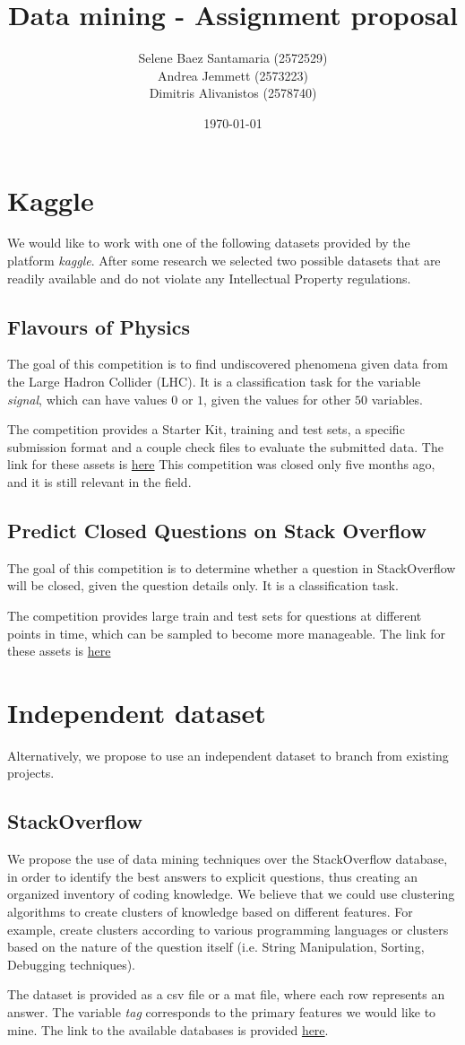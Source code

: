 \documentclass[11pt]{article}
\title{
	{Data mining - Assignment proposal}
}
\author{
Selene Baez Santamaria (2572529) \\
Andrea Jemmett (2573223) \\
Dimitris Alivanistos (2578740)}
\date{\today}
\begin{document}
\maketitle

\section{Kaggle}
We would like to work with one of the following datasets provided by the platform \textit{kaggle}. After some research we selected two possible datasets that are readily available and do not violate any Intellectual Property regulations.  

\subsection{Flavours of Physics}
The goal of this competition is to find undiscovered phenomena given data from the Large Hadron Collider (LHC). It is a classification task for the variable \textit{signal}, which can have values $0$ or $1$, given the values for other $50$ variables. 

The competition provides a Starter Kit, training and test sets, a specific submission format and a couple check files to evaluate the submitted data. The link for these assets is \href{https://www.kaggle.com/c/flavours-of-physics/data}{here} This competition was closed only five months ago, and it is still relevant in the field.

\subsection{Predict Closed Questions on Stack Overflow}
The goal of this competition is to determine whether a question in StackOverflow will be closed, given the question details only. It is a classification task. 

The competition provides large train and test sets for questions at different points in time, which can be sampled to become more manageable. The link for these assets is \href{https://www.kaggle.com/c/predict-closed-questions-on-stack-overflow/data}{here}


\section{Independent dataset}
Alternatively, we propose to use an independent dataset to branch from existing projects. 

\subsection{StackOverflow}
We propose the use of data mining techniques over the StackOverflow database, in order to identify the best answers to explicit questions, thus creating an organized inventory of coding knowledge. We believe that we could use clustering algorithms to create clusters of knowledge based on different features. For example, create clusters according to various programming languages or clusters based on the nature of the question itself (i.e. String Manipulation, Sorting, Debugging techniques). 

The dataset is provided as a csv file or a mat file, where each row represents an answer. The variable \textit{tag} corresponds to the primary features we would like to mine. The link to the available databases is provided  \href{http://www.ics.uci.edu/~duboisc/stackoverflow/}{here}.
\end{document}
